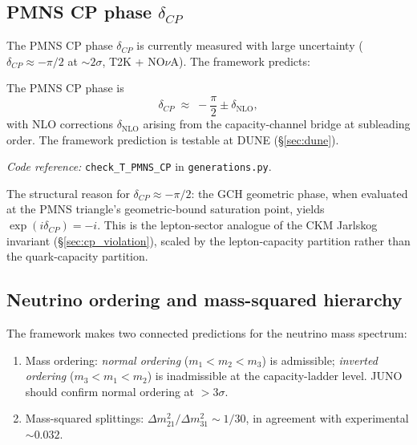 \documentclass[11pt]{article}
\newcommand{\coderef}[2]{\smallskip\noindent\textit{Code reference:} \texttt{#1} in \texttt{#2}.}
\newcommand{\epitag}[1]{\textbf{[#1]}}
\theoremstyle{definition}
\begin{document}
\subsection{PMNS CP phase \texorpdfstring{$\delta_{CP}$}{delta CP}}\label{sec:pmns_cp}

The PMNS CP phase $\delta_{CP}$ is currently measured with large uncertainty ($\delta_{CP} \approx -\pi/2$ at $\sim 2\sigma$, T2K + NO$\nu$A). The framework predicts:

\begin{tcolorbox}[apfbox, title={$T_{\mathrm{PMNS\_CP}}$ \epitag{P\_structural}+\epitag{Pred}}]
The PMNS CP phase is
\[
\delta_{CP} \;\approx\; -\frac{\pi}{2} \pm \delta_{\mathrm{NLO}},
\]
with NLO corrections $\delta_{\mathrm{NLO}}$ arising from the capacity-channel bridge at subleading order. The framework prediction is testable at DUNE (\S\ref{sec:dune}).
\end{tcolorbox}

\coderef{check\_T\_PMNS\_CP}{generations.py}

The structural reason for $\delta_{CP} \approx -\pi/2$: the GCH geometric phase, when evaluated at the PMNS triangle's geometric-bound saturation point, yields $\exp(i \delta_{CP}) = -i$. This is the lepton-sector analogue of the CKM Jarlskog invariant (\S\ref{sec:cp_violation}), scaled by the lepton-capacity partition rather than the quark-capacity partition.

\subsection{Neutrino ordering and mass-squared hierarchy}\label{sec:nu_ordering}

The framework makes two connected predictions for the neutrino mass spectrum:

\begin{tcolorbox}[apfbox, title={$T_{\mathrm{nu\_ordering}}$ + $L_{\mathrm{dm2\_hierarchy}}$ \epitag{P\_structural}+\epitag{Pred}}]
\begin{enumerate}
    \item Mass ordering: \emph{normal ordering} ($m_1 < m_2 < m_3$) is admissible; \emph{inverted ordering} ($m_3 < m_1 < m_2$) is inadmissible at the capacity-ladder level. JUNO should confirm normal ordering at $>3\sigma$.
    \item Mass-squared splittings: $\Delta m^2_{21} / \Delta m^2_{31} \sim 1/30$, in agreement with experimental $\sim 0.032$.
\end{enumerate}
\end{tcolorbox}
\end{document}
